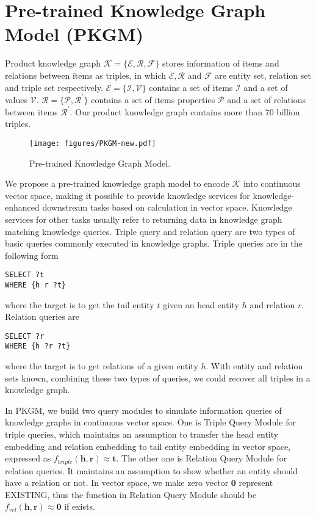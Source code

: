 \section{Pre-trained Knowledge Graph Model (PKGM)}

Product knowledge graph $\mathcal{K} = \{\mathcal{E}, \mathcal{R}, \mathcal{F}\}$ stores information of items and relations between items as triples, in which $\mathcal{E}, \mathcal{R}$ and $\mathcal{F}$ are entity set, relation set and triple set respectively. $\mathcal{E} = \{\mathcal{I, V}\}$ contains a set of items $\mathcal{I}$ and a set of values $\mathcal{V}$. $\mathcal{R} = \{ \mathcal{P}, \mathcal{R^\prime} \}$ contains a set of items properties $\mathcal{P}$ and a set of relations between items $\mathcal{R}^\prime$. Our product knowledge graph contains more than $70$ billion triples. 

\begin{figure*}
    \centering
    \texttt{[image: figures/PKGM-new.pdf]}
    \caption{Pre-trained Knowledge Graph Model.}
    \label{fig:PKGM}
\end{figure*}

We propose a pre-trained knowledge graph model to encode $\mathcal{K}$ into continuous vector space, making it possible to provide knowledge services for knowledge-enhanced downstream tasks based on calculation in vector space. Knowledge services for other tasks usually refer to returning data in knowledge graph matching knowledge queries. Triple query and relation query are two types of basic queries commonly executed in knowledge graphs. Triple queries are in the following form
\begin{lstlisting}[frame=shadowbox]
SELECT ?t
WHERE {h r ?t}
\end{lstlisting}
where the target is to get the tail entity $t$ given an head entity $h$ and relation $r$. Relation queries are
\begin{lstlisting}[frame=shadowbox]
SELECT ?r
WHERE {h ?r ?t}
\end{lstlisting}
where the target is to get relations of a given entity $h$. 
With entity and relation sets known, combining these two types of queries, we could recover all triples in a knowledge graph. 


In PKGM, we build two query modules to simulate information queries of knowledge graphs in continuous vector space. One is Triple Query Module for triple queries, which maintains an assumption to transfer the head entity embedding and relation embedding to tail entity embedding in vector space, expressed as $f_{triple}(\textbf{h}, \textbf{r}) \approx \textbf{t}$. The other one is Relation Query Module for relation queries. It maintains an assumption to show whether an entity should have a relation or not. In vector space, we make zero vector $\mathbf{0}$ represent EXISTING, thus the function in Relation Query Module should be  $f_{rel}(\mathbf{h}, \mathbf{r}) \approx \mathbf{0}$ if exists. 

